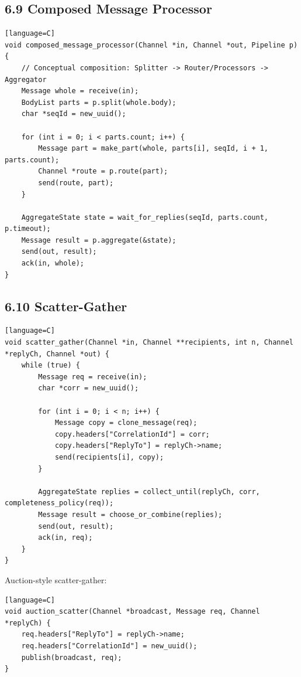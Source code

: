 \documentclass[11pt]{article}
\begin{document}
\subsection{6.9 Composed Message
Processor}\label{composed-message-processor}

\begin{verbatim}[language=C]
void composed_message_processor(Channel *in, Channel *out, Pipeline p) {
    // Conceptual composition: Splitter -> Router/Processors -> Aggregator
    Message whole = receive(in);
    BodyList parts = p.split(whole.body);
    char *seqId = new_uuid();

    for (int i = 0; i < parts.count; i++) {
        Message part = make_part(whole, parts[i], seqId, i + 1, parts.count);
        Channel *route = p.route(part);
        send(route, part);
    }

    AggregateState state = wait_for_replies(seqId, parts.count, p.timeout);
    Message result = p.aggregate(&state);
    send(out, result);
    ack(in, whole);
}
\end{verbatim}

\subsection{6.10 Scatter-Gather}\label{scatter-gather}

\begin{verbatim}[language=C]
void scatter_gather(Channel *in, Channel **recipients, int n, Channel *replyCh, Channel *out) {
    while (true) {
        Message req = receive(in);
        char *corr = new_uuid();

        for (int i = 0; i < n; i++) {
            Message copy = clone_message(req);
            copy.headers["CorrelationId"] = corr;
            copy.headers["ReplyTo"] = replyCh->name;
            send(recipients[i], copy);
        }

        AggregateState replies = collect_until(replyCh, corr, completeness_policy(req));
        Message result = choose_or_combine(replies);
        send(out, result);
        ack(in, req);
    }
}
\end{verbatim}

Auction-style scatter-gather:

\begin{verbatim}[language=C]
void auction_scatter(Channel *broadcast, Message req, Channel *replyCh) {
    req.headers["ReplyTo"] = replyCh->name;
    req.headers["CorrelationId"] = new_uuid();
    publish(broadcast, req);
}
\end{verbatim}
\end{document}
